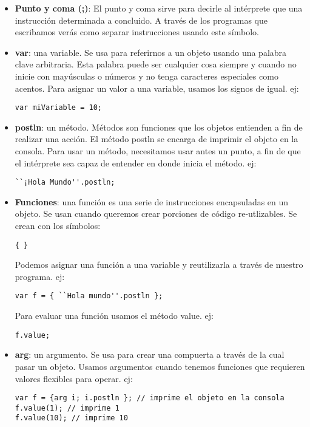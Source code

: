 \begin{itemize}
\item \textbf{Punto y coma (;)}: El punto y coma sirve para decirle al intérprete que una instrucción determinada a concluido. A través de los programas que escribamos verás como separar instrucciones usando este símbolo.

\item \textbf{var}: una variable. Se usa para referirnos a un objeto usando una palabra clave arbitraria. Esta palabra puede ser cualquier cosa siempre y cuando no inicie con mayúsculas o números y no tenga caracteres especiales como acentos. Para asignar un valor a una variable, usamos los signos de igual. ej: 

\begin{verbatim} 
var miVariable = 10;
\end{verbatim}

\item \textbf{postln}: un método. Métodos son funciones que los objetos entienden a fin de realizar una acción. El método postln se encarga de imprimir el objeto en la consola. Para usar un método, necesitamos usar antes un punto, a fin de que el intérprete sea capaz de entender en donde inicia el método. ej: 

\begin{verbatim} 
``¡Hola Mundo''.postln;
\end{verbatim}

\item \textbf{Funciones}: una función es una serie de instrucciones encapsuladas en un objeto. Se usan cuando queremos crear porciones de código re-utlizables. Se crean con los símbolos:

 \begin{verbatim} 
{ }
\end{verbatim}

Podemos asignar una función a una variable y reutilizarla a través de nuestro programa. ej:

\begin{verbatim} 
var f = { ``Hola mundo''.postln };
\end{verbatim}

Para evaluar una función usamos el método value. ej:

\begin{verbatim} 
f.value;
\end{verbatim}

\item \textbf{arg}: un argumento. Se usa para crear una compuerta a través de la cual pasar un objeto. Usamos argumentos cuando tenemos funciones que requieren valores flexibles para operar. ej: 

\begin{verbatim} 
var f = {arg i; i.postln }; // imprime el objeto en la consola
f.value(1); // imprime 1
f.value(10); // imprime 10
\end{verbatim}

\end{itemize}

